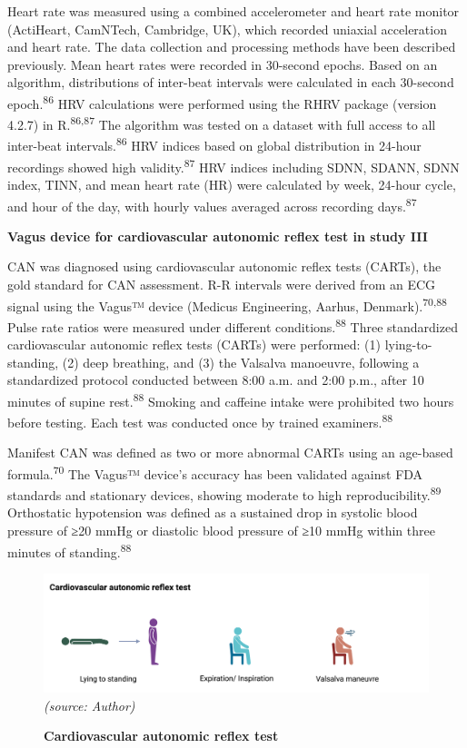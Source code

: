 \documentclass[
  a4paper,
  headsepline=true,
  open=left]{scrbook}
\begin{document}
Heart rate was measured using a combined accelerometer and heart rate
monitor (ActiHeart, CamNTech, Cambridge, UK), which recorded uniaxial
acceleration and heart rate. The data collection and processing methods
have been described previously. Mean heart rates were recorded in
30-second epochs. Based on an algorithm, distributions of inter-beat
intervals were calculated in each 30-second epoch.\textsuperscript{86}
HRV calculations were performed using the RHRV package (version 4.2.7)
in R.\textsuperscript{86,87} The algorithm was tested on a dataset with
full access to all inter-beat intervals.\textsuperscript{86} HRV indices
based on global distribution in 24-hour recordings showed high
validity.\textsuperscript{87} HRV indices including SDNN, SDANN, SDNN
index, TINN, and mean heart rate (HR) were calculated by week, 24-hour
cycle, and hour of the day, with hourly values averaged across recording
days.\textsuperscript{87}

\textbf{Vagus device for cardiovascular autonomic reflex test in study
III}

CAN was diagnosed using cardiovascular autonomic reflex tests (CARTs),
the gold standard for CAN assessment. R-R intervals were derived from an
ECG signal using the Vagus™ device (Medicus Engineering, Aarhus,
Denmark).\textsuperscript{70,88} Pulse rate ratios were measured under
different conditions.\textsuperscript{88} Three standardized
cardiovascular autonomic reflex tests (CARTs) were performed: (1)
lying-to-standing, (2) deep breathing, and (3) the Valsalva manoeuvre,
following a standardized protocol conducted between 8:00 a.m. and 2:00
p.m., after 10 minutes of supine rest.\textsuperscript{88} Smoking and
caffeine intake were prohibited two hours before testing. Each test was
conducted once by trained examiners.\textsuperscript{88}

Manifest CAN was defined as two or more abnormal CARTs using an
age-based formula.\textsuperscript{70} The Vagus™ device's accuracy has
been validated against FDA standards and stationary devices, showing
moderate to high reproducibility.\textsuperscript{89} Orthostatic
hypotension was defined as a sustained drop in systolic blood pressure
of ≥20 mmHg or diastolic blood pressure of ≥10 mmHg within three minutes
of standing.\textsuperscript{88}

\begin{figure}

{\centering 

\includegraphics{images/cart.png} \emph{(source: Author)}

}

\caption{\label{fig-cart}\textbf{Cardiovascular autonomic reflex test}}

\end{figure}
\end{document}
